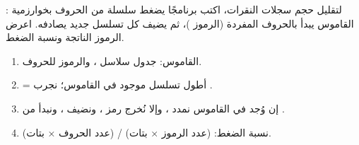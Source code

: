 \begin{statement}
لتقليل حجم سجلات النقرات، اكتب برنامجًا يضغط سلسلة من الحروف  بخوارزمية \textbf{}: القاموس يبدأ بالحروف المفردة (الرموز )، ثم يضيف كل تسلسل جديد يصادفه. اعرض الرموز الناتجة ونسبة الضغط.
\end{statement}
\begin{stepsbox}\begin{enumerate}
\item القاموس: جدول سلاسل ، والرموز  للحروف.
\item {} = أطول تسلسل موجود في القاموس؛ نجرب .
\item إن وُجد في القاموس نمدد ، وإلا نُخرج رمز ، ونضيف ، ونبدأ من .
\item نسبة الضغط: (عدد الرموز ×  بتات) / (عدد الحروف ×  بتات).
\end{enumerate}\end{stepsbox}
